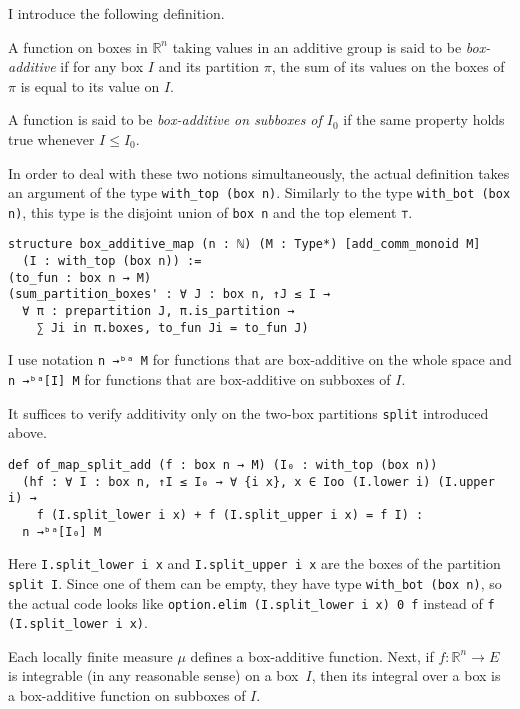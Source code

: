 \documentclass[a4paper,UKenglish,cleveref, autoref, thm-restate]{lipics-v2021}
\newcommand{\bbR}{\mathbb{R}}
\begin{document}
I introduce the following definition.

\begin{definition}
  A function on boxes in \(\bbR^{n}\) taking values in an additive
  group is said to be \emph{box-additive} if for any box \(I\) and its
  partition \(\pi\), the sum of its values on the boxes of \(\pi\) is
  equal to its value on \(I\).

  A function is said to be \emph{box-additive on subboxes of
    \(I_{0}\)} if the same property holds true whenever \(I\le I_{0}\).
\end{definition}

In order to deal with these two notions simultaneously, the actual
definition takes an argument of the type
\lstinline=with_top (box n)=. Similarly to the type
\lstinline=with_bot (box n)=, this type is the disjoint union of
\lstinline=box n= and the top element \lstinline=⊤=.

\begin{lstlisting}[caption=Definition of a box additive function,label={lst:box-additive}]
structure box_additive_map (n : ℕ) (M : Type*) [add_comm_monoid M]
  (I : with_top (box n)) :=
(to_fun : box n → M)
(sum_partition_boxes' : ∀ J : box n, ↑J ≤ I →
  ∀ π : prepartition J, π.is_partition →
    ∑ Ji in π.boxes, to_fun Ji = to_fun J)
\end{lstlisting}

I use notation \lstinline=n →ᵇᵃ M= for functions that are box-additive
on the whole space and \lstinline=n →ᵇᵃ[I] M= for functions that are
box-additive on subboxes of \(I\).

It suffices to verify additivity only on the two-box partitions
\lstinline=split= introduced above.
\begin{lstlisting}
def of_map_split_add (f : box n → M) (I₀ : with_top (box n))
  (hf : ∀ I : box n, ↑I ≤ I₀ → ∀ {i x}, x ∈ Ioo (I.lower i) (I.upper i) →
    f (I.split_lower i x) + f (I.split_upper i x) = f I) :
  n →ᵇᵃ[I₀] M
\end{lstlisting}

Here \lstinline=I.split_lower i x= and \lstinline=I.split_upper i x=
are the boxes of the partition \lstinline=split I=. Since one of them
can be empty, they have type \lstinline=with_bot (box n)=, so the
actual code looks like \lstinline=option.elim (I.split_lower i x) 0 f=
instead of \lstinline=f (I.split_lower i x)=.

Each locally finite measure \(\mu\) defines a box-additive function.
Next, if \(f\colon\bbR^{n}\to E\) is integrable (in any reasonable
sense) on a box~\(I\), then its integral over a box is a box-additive
function on subboxes of \(I\).
\end{document}
